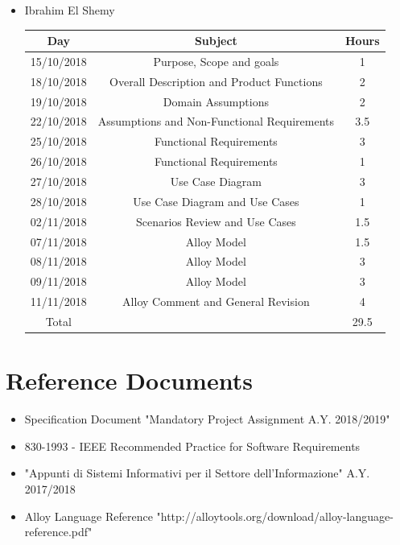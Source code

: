 \documentclass[12pt,a4paper]{article}
\begin{document}
\begin{itemize}
		\item Ibrahim El Shemy
		\begin{center}
			\begin{tabular}{| c | c | c |}
				\hline
				Day & Subject & Hours \\ \hline
				15/10/2018 & Purpose, Scope and goals & 1 \\
				18/10/2018 & Overall Description and Product Functions & 2 \\
				19/10/2018  & Domain Assumptions & 2 \\
				22/10/2018  & Assumptions and Non-Functional Requirements & 3.5 \\
				25/10/2018 & Functional Requirements & 3 \\
				26/10/2018 & Functional Requirements & 1 \\
				27/10/2018 & Use Case Diagram & 3 \\
				28/10/2018 & Use Case Diagram and Use Cases & 1 \\
				02/11/2018 & Scenarios Review and Use Cases & 1.5 \\
				07/11/2018 & Alloy Model & 1.5 \\
				08/11/2018 & Alloy Model & 3 \\
				09/11/2018 & Alloy Model & 3 \\
				11/11/2018 & Alloy Comment and General Revision & 4 \\
				\hline
				Total & & 29.5 \\
				\hline
			\end{tabular}
		\end{center}
	\end{itemize}
	\section{Reference Documents}
	\begin{itemize}
		\item Specification Document "Mandatory Project Assignment A.Y. 2018/2019"
		\item 830-1993 - IEEE Recommended Practice for Software Requirements
		\item "Appunti di Sistemi Informativi per il Settore dell'Informazione" A.Y. 2017/2018
		\item Alloy Language Reference "http://alloytools.org/download/alloy-language-reference.pdf"
	\end{itemize}
\end{document}
